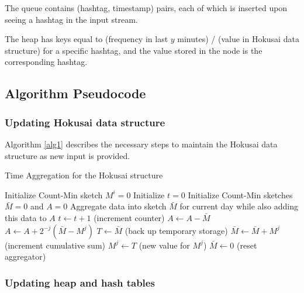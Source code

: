\documentclass[twoside]{article}
\begin{document}
\begin{multicols}{2}
The queue contains (hashtag, timestamp) pairs, each of which is inserted upon seeing a hashtag in the input stream.

The heap has keys equal to (frequency in last $y$ minutes) / (value in Hokusai data structure) for a specific hashtag, and the value stored in the node is the corresponding hashtag.

\subsection{Algorithm Pseudocode} 

\subsubsection{Updating Hokusai data structure\label{Hokusai}}

Algorithm \ref{alg1} describes the necessary steps to maintain the Hokusai data structure as new input is provided.

\begin{algorithm}
\caption{Time Aggregation for the Hokusai structure}\label{alg1}
\begin{algorithmic}[1]
	\State Initialize Count-Min sketch $M^i = 0$
\EndFor
\State Initialize $t = 0$
\State Initialize Count-Min sketches $\bar{M} = 0$ and $A = 0$
	\State Aggregate data into sketch $\bar{M}$ for current day while also adding this data to $A$
	\State $t \leftarrow t + 1$ (increment counter)
	\State $A \leftarrow A - \bar{M}$
		\State $A \leftarrow A + 2^{-j}(\bar{M} - M^j)$
		\State $T \leftarrow \bar{M}$ (back up temporary storage)
		\State $\bar{M} \leftarrow \bar{M} + M^j$ (increment cumulative sum)
		\State $M^j \leftarrow T$ (new value for $M^j$)
	\EndFor
	\State $\bar{M} \leftarrow 0$ (reset aggregator)
\EndWhile
\end{algorithmic}
\end{algorithm}

\subsubsection{Updating heap and hash tables}


\end{multicols}
\end{document}
